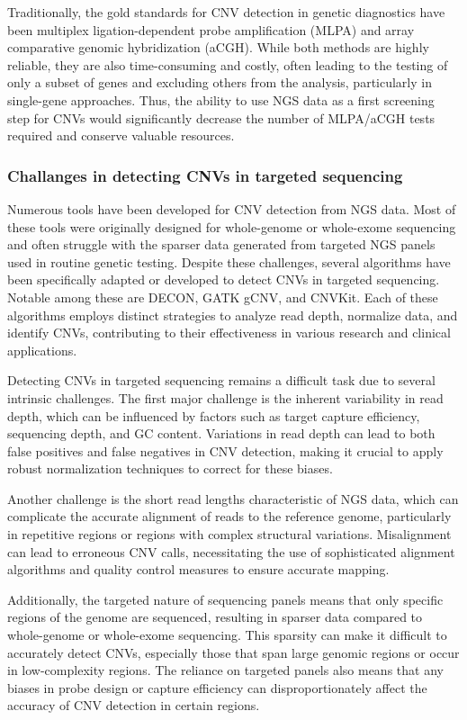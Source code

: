 \documentclass[a4paper,12pt,twoside]{ThesisStyle}
\begin{document}
Traditionally, the gold standards for CNV detection in genetic diagnostics have been multiplex ligation-dependent probe amplification (MLPA) and array comparative genomic hybridization (aCGH). While both methods are highly reliable, they are also time-consuming and costly, often leading to the testing of only a subset of genes and excluding others from the analysis, particularly in single-gene approaches. Thus, the ability to use NGS data as a first screening step for CNVs would significantly decrease the number of MLPA/aCGH tests required and conserve valuable resources.

\subsubsection{Challanges in detecting CNVs in targeted sequencing}
Numerous tools have been developed for CNV detection from NGS data. Most of these tools were originally designed for whole-genome or whole-exome sequencing and often struggle with the sparser data generated from targeted NGS panels used in routine genetic testing. Despite these challenges, several algorithms have been specifically adapted or developed to detect CNVs in targeted sequencing. Notable among these are DECON, GATK gCNV, and CNVKit. Each of these algorithms employs distinct strategies to analyze read depth, normalize data, and identify CNVs, contributing to their effectiveness in various research and clinical applications.

Detecting CNVs in targeted sequencing remains a difficult task due to several intrinsic challenges. The first major challenge is the inherent variability in read depth, which can be influenced by factors such as target capture efficiency, sequencing depth, and GC content. Variations in read depth can lead to both false positives and false negatives in CNV detection, making it crucial to apply robust normalization techniques to correct for these biases.

Another challenge is the short read lengths characteristic of NGS data, which can complicate the accurate alignment of reads to the reference genome, particularly in repetitive regions or regions with complex structural variations. Misalignment can lead to erroneous CNV calls, necessitating the use of sophisticated alignment algorithms and quality control measures to ensure accurate mapping.

Additionally, the targeted nature of sequencing panels means that only specific regions of the genome are sequenced, resulting in sparser data compared to whole-genome or whole-exome sequencing. This sparsity can make it difficult to accurately detect CNVs, especially those that span large genomic regions or occur in low-complexity regions. The reliance on targeted panels also means that any biases in probe design or capture efficiency can disproportionately affect the accuracy of CNV detection in certain regions.
\end{document}
